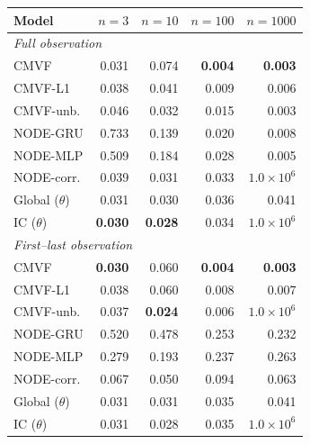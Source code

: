 \begin{tabular}{lrrrr}
\toprule
Model & $n{=}3$ & $n{=}10$ & $n{=}100$ & $n{=}1000$ \\
\midrule
\multicolumn{5}{l}{\emph{Full observation}} \\
CMVF & 0.031 & 0.074 & \textbf{0.004} & \textbf{0.003} \\
CMVF-L1 & 0.038 & 0.041 & 0.009 & 0.006 \\
CMVF-unb. & 0.046 & 0.032 & 0.015 & 0.003 \\
NODE-GRU & 0.733 & 0.139 & 0.020 & 0.008 \\
NODE-MLP & 0.509 & 0.184 & 0.028 & 0.005 \\
NODE-corr. & 0.039 & 0.031 & 0.033 & $1.0\!\times\!10^{6}$ \\
Global ($\theta$) & 0.031 & 0.030 & 0.036 & 0.041 \\
IC ($\theta$) & \textbf{0.030} & \textbf{0.028} & 0.034 & $1.0\!\times\!10^{6}$ \\
\midrule
\multicolumn{5}{l}{\emph{First--last observation}} \\
CMVF & \textbf{0.030} & 0.060 & \textbf{0.004} & \textbf{0.003} \\
CMVF-L1 & 0.038 & 0.060 & 0.008 & 0.007 \\
CMVF-unb. & 0.037 & \textbf{0.024} & 0.006 & $1.0\!\times\!10^{6}$ \\
NODE-GRU & 0.520 & 0.478 & 0.253 & 0.232 \\
NODE-MLP & 0.279 & 0.193 & 0.237 & 0.263 \\
NODE-corr. & 0.067 & 0.050 & 0.094 & 0.063 \\
Global ($\theta$) & 0.031 & 0.031 & 0.035 & 0.041 \\
IC ($\theta$) & 0.031 & 0.028 & 0.035 & $1.0\!\times\!10^{6}$ \\
\bottomrule
\end{tabular}
